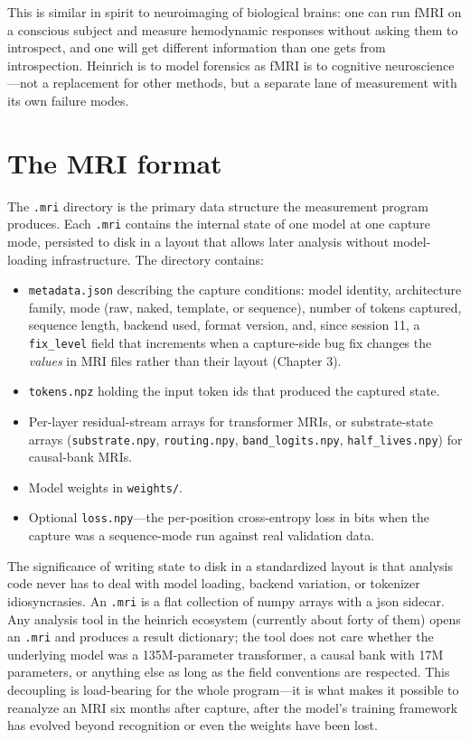 \documentclass[11pt,openany]{book}
\begin{document}
This is similar in spirit to neuroimaging of biological brains: one
can run fMRI on a conscious subject and measure hemodynamic responses
without asking them to introspect, and one will get different
information than one gets from introspection. Heinrich is to model
forensics as fMRI is to cognitive neuroscience---not a replacement
for other methods, but a separate lane of measurement with its own
failure modes.

\section{The MRI format}

The \texttt{.mri} directory is the primary data structure the
measurement program produces. Each \texttt{.mri} contains the
internal state of one model at one capture mode, persisted to disk in
a layout that allows later analysis without model-loading
infrastructure. The directory contains:

\begin{itemize}
  \item \texttt{metadata.json} describing the capture conditions:
  model identity, architecture family, mode (raw, naked, template, or
  sequence), number of tokens captured, sequence length, backend
  used, format version, and, since session 11, a \texttt{fix\_level}
  field that increments when a capture-side bug fix changes the
  \emph{values} in MRI files rather than their layout (Chapter 3).
  \item \texttt{tokens.npz} holding the input token ids that produced
  the captured state.
  \item Per-layer residual-stream arrays for transformer MRIs, or
  substrate-state arrays (\texttt{substrate.npy},
  \texttt{routing.npy}, \texttt{band\_logits.npy},
  \texttt{half\_lives.npy}) for causal-bank MRIs.
  \item Model weights in \texttt{weights/}.
  \item Optional \texttt{loss.npy}---the per-position cross-entropy
  loss in bits when the capture was a sequence-mode run against real
  validation data.
\end{itemize}

The significance of writing state to disk in a standardized layout is
that analysis code never has to deal with model loading, backend
variation, or tokenizer idiosyncrasies. An \texttt{.mri} is a flat
collection of numpy arrays with a json sidecar. Any analysis tool in
the heinrich ecosystem (currently about forty of them) opens an
\texttt{.mri} and produces a result dictionary; the tool does not
care whether the underlying model was a 135M-parameter transformer, a
causal bank with 17M parameters, or anything else as long as the
field conventions are respected. This decoupling is load-bearing for
the whole program---it is what makes it possible to reanalyze an MRI
six months after capture, after the model's training framework has
evolved beyond recognition or even the weights have been lost.
\end{document}
